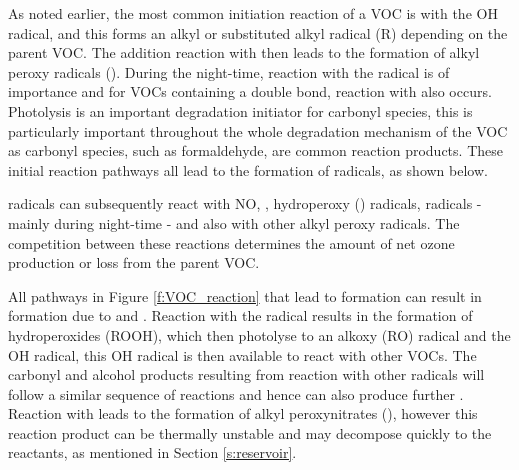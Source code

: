 As noted earlier, the most common initiation reaction of a VOC is with the OH radical, and this forms an alkyl or substituted alkyl radical (R) depending on the parent VOC. 
The addition reaction with  then leads to the formation of alkyl peroxy radicals (). 
During the night-time, reaction with the  radical is of importance and for VOCs containing a double bond, reaction with  also occurs. 
Photolysis is an important degradation initiator for carbonyl species, this is particularly important throughout the whole degradation mechanism of the VOC as carbonyl species, such as formaldehyde, are common reaction products. 
These initial reaction pathways all lead to the formation of  radicals, as shown below.
\begin{reactionlist}
\end{reactionlist} 
 radicals can subsequently react with NO, , hydroperoxy () radicals,  radicals - mainly during night-time - and also with other alkyl peroxy radicals. 
The competition between these reactions determines the amount of net ozone production or loss from the parent VOC. 
\begin{reactionlist}
\end{reactionlist}
All pathways in Figure \ref{f:VOC_reaction} that lead to  formation can result in  formation due to  and . 
Reaction with the  radical results in the formation of hydroperoxides (ROOH), which then photolyse to an alkoxy (RO) radical and the OH radical, this OH radical is then available to react with other VOCs. 
The carbonyl and alcohol products resulting from reaction with other  radicals will follow a similar sequence of reactions and hence can also produce further . 
Reaction with  leads to the formation of alkyl peroxynitrates (), however this reaction product can be thermally unstable and may decompose quickly to the reactants, as mentioned in Section \ref{s:reservoir}.

